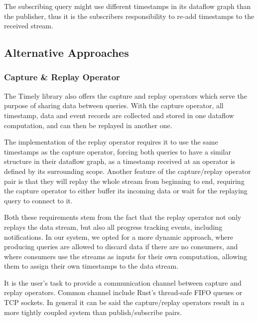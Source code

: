 The subscribing query might use different timestamps in its dataflow graph
than the publisher, thus it is the subscribers responsibility to re-add
timestamps to the received stream. 

\subsection{Alternative Approaches}

\subsubsection{Capture \& Replay Operator}

The Timely library also offers the capture and replay operators which serve the
purpose of sharing data between queries. With the capture operator, all timestamp,
data and event records are collected and stored in one dataflow computation,
and can then be replayed in another one.

The implementation of the replay operator requires it to use the same timestamps
as the capture operator, forcing both queries to have a similar structure
in their dataflow graph, as a timestamp received at an operator is defined
by its surrounding scope. Another feature of the capture/replay operator pair
is that they will replay the whole stream from beginning to end, requiring the
capture operator to either buffer its incoming data or wait for the replaying
query to connect to it. 

Both these requirements stem from the fact that the replay operator not only
replays the data stream, but also all progress tracking events, including
notifications. In our system, we opted for a more dynamic approach, where
producing queries are allowed to discard data if there are no consumers, and
where consumers use the streams as inputs for their own computation,
allowing them to assign their own timestamps to the data stream.

It is the user's task to provide a communication channel between capture and 
replay operators. Common channel include Rust's thread-safe FIFO queues or
TCP sockets. In general it can be said the capture/replay operators result
in a more tightly coupled system than publish/subscribe pairs.

